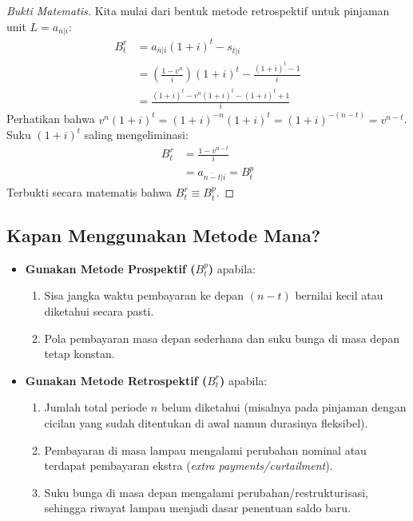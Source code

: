\documentclass[11pt,a4paper]{article}
\begin{document}
\begin{proof}[Bukti Matematis]
Kita mulai dari bentuk metode retrospektif untuk pinjaman unit $L = a_{\overline{n}|i}$:
\begin{align*}
    B_t^r &= a_{\overline{n}|i}(1+i)^t - s_{\overline{t}|i} \\
    &= \left( \frac{1 - v^n}{i} \right) (1+i)^t - \frac{(1+i)^t - 1}{i} \\
    &= \frac{(1+i)^t - v^n (1+i)^t - (1+i)^t + 1}{i}
\end{align*}
Perhatikan bahwa $v^n (1+i)^t = (1+i)^{-n}(1+i)^t = (1+i)^{-(n-t)} = v^{n-t}$. Suku $(1+i)^t$ saling mengeliminasi:
\begin{align*}
    B_t^r &= \frac{1 - v^{n-t}}{i} \\
    &= a_{\overline{n-t}|i} = B_t^p
\end{align*}
Terbukti secara matematis bahwa $B_t^r \equiv B_t^p$.
\end{proof}

\subsection{Kapan Menggunakan Metode Mana?}

\begin{notebox}
\begin{itemize}
    \item \textbf{Gunakan Metode Prospektif ($B_t^p$)} apabila:
    \begin{enumerate}
        \item Sisa jangka waktu pembayaran ke depan $(n-t)$ bernilai kecil atau diketahui secara pasti.
        \item Pola pembayaran masa depan sederhana dan suku bunga di masa depan tetap konstan.
    \end{enumerate}
    \item \textbf{Gunakan Metode Retrospektif ($B_t^r$)} apabila:
    \begin{enumerate}
        \item Jumlah total periode $n$ belum diketahui (misalnya pada pinjaman dengan cicilan yang sudah ditentukan di awal namun durasinya fleksibel).
        \item Pembayaran di masa lampau mengalami perubahan nominal atau terdapat pembayaran ekstra (\textit{extra payments/curtailment}).
        \item Suku bunga di masa depan mengalami perubahan/restrukturisasi, sehingga riwayat lampau menjadi dasar penentuan saldo baru.
    \end{enumerate}
\end{itemize}
\end{notebox}
\end{document}
